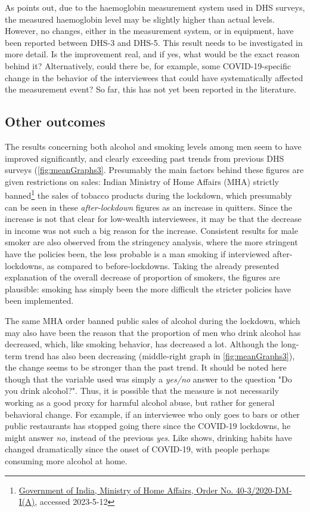 \documentclass[12pt,a4paper,notitlepage]{article}
\begin{document}
As \citet{Rai:2023} points out, due to the haemoglobin measurement system used in DHS surveys, the measured haemoglobin level may be slightly higher than actual levels. However, no changes, either in the measurement system, or in equipment, have been reported between DHS-3 and DHS-5. This result needs to be investigated in more detail. Is the improvement real, and if yes, what would be the exact reason behind it? Alternatively, could there be, for example, some COVID-19-specific change in the behavior of the interviewees that could have systematically affected the measurement event? So far, this has not yet been reported in the literature.

\subsection{Other outcomes} \label{subsec:discussionOtherOutcomes}

The results concerning both alcohol and smoking levels among men seem to have improved significantly, and clearly exceeding past trends from previous DHS surveys (\cref{fig:meanGraphs3}. Presumably the main factors behind these figures are given restrictions on sales: Indian Ministry of Home Affairs (MHA) strictly banned\footnote{\href{https://www.mha.gov.in/sites/default/files/MHA\%20order\%20dt\%2015.04.2020\%2C\%20with\%20Revised\%20Consolidated\%20Guidelines\_compressed\%20\%283\%29.pdf}{Government of India, Ministry of Home Affairs, Order No. 40-3/2020-DM-I(A)}, accessed 2023-5-12} the sales of tobacco products during the lockdown, which presumably can be seen in these \textit{after-lockdown} figures as an increase in quitters. Since the increase is not that clear for low-wealth interviewees, it may be that the decrease in income was not such a big reason for the increase. Consistent results for male smoker are also observed from the stringency analysis, where the more stringent have the policies been, the less probable is a man smoking if interviewed after-lockdowns, as compared to before-lockdowns. Taking the already presented explanation of the overall decrease of proportion of smokers, the figures are plausible: smoking has simply been the more difficult the stricter policies have been implemented.

The same MHA order banned public sales of alcohol during the lockdown, which may also have been the reason that the proportion of men who drink alcohol has decreased, which, like smoking behavior, has decreased a lot. Although the long-term trend has also been decreasing (middle-right graph in \cref{fig:meanGraphs3}), the change seems to be stronger than the past trend. It should be noted here though that the variable used was simply a \textit{yes/no} answer to the question "Do you drink alcohol?". Thus, it is possible that the measure is not necessarily working as a good proxy for harmful alcohol abuse, but rather for general behavioral change. For example, if an interviewee who only goes to bars or other public restaurants has stopped going there since the COVID-19 lockdowns, he might answer \textit{no}, instead of the previous \textit{yes}. Like \citet{OECD:2021} shows, drinking habits have changed dramatically since the onset of COVID-19, with people perhaps consuming more alcohol at home.
\end{document}
